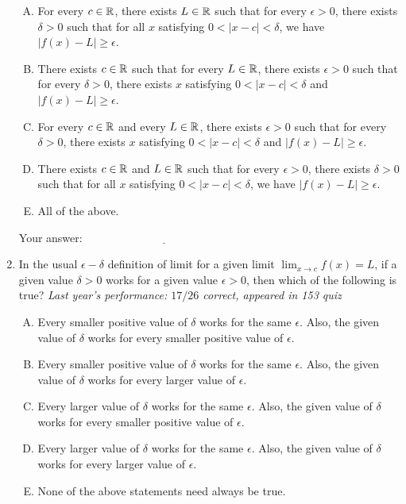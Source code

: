 \documentclass[10pt]{amsart}
\begin{document}
\begin{enumerate}
  \begin{enumerate}[(A)]
  \item For every $c \in \mathbb{R}$, there exists $L \in \mathbb{R}$ such that for
    every $\epsilon > 0$, there exists $\delta > 0$ such that for all
    $x$ satisfying $0 < |x - c| < \delta$, we have $|f(x) - L| \ge
    \epsilon$.
  \item There exists $c \in \mathbb{R}$ such that for every $L \in \mathbb{R}$, there
    exists $\epsilon > 0$ such that for every $\delta > 0$, there exists
    $x$ satisfying $0 < |x - c| < \delta$ and $|f(x) - L| \ge \epsilon$.
  \item For every $c \in \mathbb{R}$ and every $L \in \mathbb{R}$, there exists
    $\epsilon > 0$ such that for every $\delta > 0$, there exists $x$
    satisfying $0 < |x - c| < \delta$ and $|f(x) - L| \ge \epsilon$.
  \item There exists $c \in \mathbb{R}$ and $L \in \mathbb{R}$ such that for
    every $\epsilon > 0$, there exists $\delta > 0$ such that for all
    $x$ satisfying $0 < |x - c| < \delta$, we have $|f(x) - L| \ge
    \epsilon$.
  \item All of the above.
  \end{enumerate}

  \vspace{0.1in}
  Your answer: $\underline{\qquad\qquad\qquad\qquad\qquad\qquad\qquad}$
  \vspace{0.5in}

\item In the usual $\epsilon-\delta$ definition of limit for a given
  limit $\lim_{x \to c} f(x) = L$, if a given value $\delta > 0$ works
  for a given value $\epsilon > 0$, then which of the following is
  true? {\em Last year's performance: $17/26$ correct, appeared in 153
  quiz}

  \begin{enumerate}[(A)]
  \item Every smaller positive value of $\delta$ works for the same
    $\epsilon$. Also, the given value of $\delta$ works for every
    smaller positive value of $\epsilon$.
  \item Every smaller positive value of $\delta$ works for the same
    $\epsilon$. Also, the given value of $\delta$ works for every
    larger value of $\epsilon$.
  \item Every larger value of $\delta$ works for the same
    $\epsilon$. Also, the given value of $\delta$ works for every
    smaller positive value of $\epsilon$.
  \item Every larger value of $\delta$ works for the same
    $\epsilon$. Also, the given value of $\delta$ works for every
    larger value of $\epsilon$.
  \item None of the above statements need always be true.
  \end{enumerate}


\end{enumerate}
\end{document}
